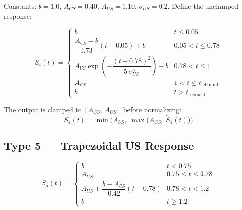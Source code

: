 \documentclass{article}
\begin{document}
Constants: $b = 1.0$, $A_{CS} = 0.40$, $A_{US} = 1.10$, $\sigma_{US} = 0.2$.
Define the unclamped response:

\begin{equation}
    \tilde{S}_4(t) = \begin{cases}
        b                                                                                     & t \leq 0.05          \\[4pt]
        \dfrac{A_{CS} - b}{0.73}(t - 0.05) + b                                              & 0.05 < t \leq 0.78   \\[8pt]
        A_{US}\exp\!\left(-\dfrac{(t - 0.78)^2}{5\,\sigma_{US}^5}\right) + b               & 0.78 < t \leq 1      \\[6pt]
        A_{CS}                                                                               & 1 < t \leq t_{\mathrm{rebound}}         \\[4pt]
        b                                                                                     & t > t_{\mathrm{rebound}}
    \end{cases}
\end{equation}

The output is clamped to $[A_{CS},\, A_{US}]$ before normalizing:
\begin{equation}\label{eq:type4}
    S_4(t) = \min\!\bigl(A_{US},\; \max\!\bigl(A_{CS},\; \tilde{S}_4(t)\bigr)\bigr)
\end{equation}

\subsection*{Type 5 --- Trapezoidal US Response}

\begin{equation}\label{eq:type5}
    S_5(t) = \begin{cases}
        b                                                                    & t < 0.75            \\[4pt]
        A_{US}                                                               & 0.75 \leq t \leq 0.78 \\[4pt]
        A_{US} + \dfrac{b - A_{US}}{0.42}(t - 0.78)                        & 0.78 < t < 1.2      \\[8pt]
        b                                                                    & t \geq 1.2
    \end{cases}
\end{equation}
\end{document}
